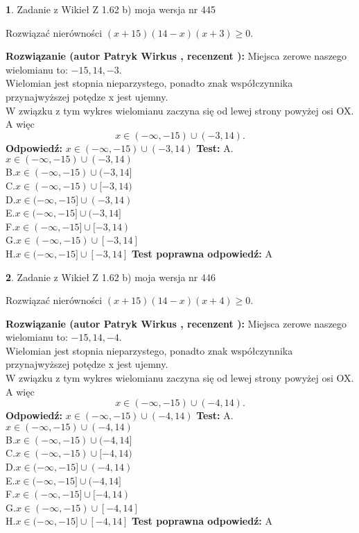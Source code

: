 \documentclass[12pt, a4paper]{article}
\theoremstyle{definition} %
\newtheorem{zad}{}
\newcommand{\zadStart}[1]{\begin{zad}#1\newline}
\newcommand{\zadStop}{\end{zad}}
\newcommand{\rozwStart}[2]{\noindent \textbf{Rozwiązanie (autor #1 , recenzent #2): }\newline}
\newcommand{\rozwStop}{\newline}
\newcommand{\odpStart}{\noindent \textbf{Odpowiedź:}\newline}
\newcommand{\odpStop}{\newline}
\newcommand{\testStart}{\noindent \textbf{Test:}\newline}
\newcommand{\testStop}{\newline}
\newcommand{\kluczStart}{\noindent \textbf{Test poprawna odpowiedź:}\newline}
\newcommand{\kluczStop}{\newline}
\begin{document}
\zadStart{Zadanie z Wikieł Z 1.62 b) moja wersja nr 445}

Rozwiązać nierówności $(x+15)(14-x)(x+3)\ge0$.
\zadStop
\rozwStart{Patryk Wirkus}{}
Miejsca zerowe naszego wielomianu to: $-15, 14, -3$.\\
Wielomian jest stopnia nieparzystego, ponadto znak współczynnika przy\linebreak najwyższej potędze x jest ujemny.\\ W związku z tym wykres wielomianu zaczyna się od lewej strony powyżej osi OX. A więc $$x \in (-\infty,-15) \cup (-3,14).$$
\rozwStop
\odpStart
$x \in (-\infty,-15) \cup (-3,14)$
\odpStop
\testStart
A.$x \in (-\infty,-15) \cup (-3,14)$\\
B.$x \in (-\infty,-15) \cup (-3,14]$\\
C.$x \in (-\infty,-15) \cup [-3,14)$\\
D.$x \in (-\infty,-15] \cup (-3,14)$\\
E.$x \in (-\infty,-15] \cup (-3,14]$\\
F.$x \in (-\infty,-15] \cup [-3,14)$\\
G.$x \in (-\infty,-15) \cup [-3,14]$\\
H.$x \in (-\infty,-15] \cup [-3,14]$
\testStop
\kluczStart
A
\kluczStop



\zadStart{Zadanie z Wikieł Z 1.62 b) moja wersja nr 446}

Rozwiązać nierówności $(x+15)(14-x)(x+4)\ge0$.
\zadStop
\rozwStart{Patryk Wirkus}{}
Miejsca zerowe naszego wielomianu to: $-15, 14, -4$.\\
Wielomian jest stopnia nieparzystego, ponadto znak współczynnika przy\linebreak najwyższej potędze x jest ujemny.\\ W związku z tym wykres wielomianu zaczyna się od lewej strony powyżej osi OX. A więc $$x \in (-\infty,-15) \cup (-4,14).$$
\rozwStop
\odpStart
$x \in (-\infty,-15) \cup (-4,14)$
\odpStop
\testStart
A.$x \in (-\infty,-15) \cup (-4,14)$\\
B.$x \in (-\infty,-15) \cup (-4,14]$\\
C.$x \in (-\infty,-15) \cup [-4,14)$\\
D.$x \in (-\infty,-15] \cup (-4,14)$\\
E.$x \in (-\infty,-15] \cup (-4,14]$\\
F.$x \in (-\infty,-15] \cup [-4,14)$\\
G.$x \in (-\infty,-15) \cup [-4,14]$\\
H.$x \in (-\infty,-15] \cup [-4,14]$
\testStop
\kluczStart
A
\kluczStop
\end{document}
